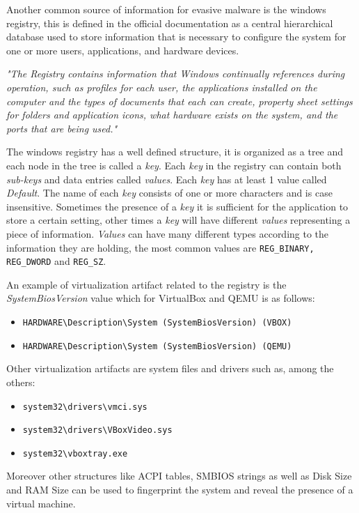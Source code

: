 Another common source of information for evasive malware is the windows registry, this is defined in the official documentation as a central hierarchical database used to store information that is necessary to configure the system for one or more users, applications, and hardware devices.

\textit{"The Registry contains information that Windows continually references during operation, such as profiles for each user, the applications installed on the computer and the types of documents that each can create, property sheet settings for folders and application icons, what hardware exists on the system, and the ports that are being used."}\cite{windocs}

The windows registry has a well defined structure, it is organized as a tree and each node in the tree is called a \textit{key}. Each \textit{key} in the registry can contain both \textit{sub-keys} and data entries called \textit{values}. Each \textit{key} has at least 1 value called \textit{Default}. The name of each \textit{key} consists of one or more characters and is case insensitive. Sometimes the presence of a \textit{key} it is sufficient for the application to store a certain setting, other times a \textit{key} will have different \textit{values} representing a piece of information. \textit{Values} can have many different types according to the information they are holding, the most common values are \lstinline{REG_BINARY, REG_DWORD} and \lstinline{REG_SZ}. 


An example of virtualization artifact related to the registry is the \textit{SystemBiosVersion} value which for VirtualBox and QEMU is as follows:
\begin{itemize}
    \item \lstinline{HARDWARE\Description\System (SystemBiosVersion) (VBOX)}
    \item \lstinline{HARDWARE\Description\System (SystemBiosVersion) (QEMU)} 
\end{itemize}

Other virtualization artifacts are system files and drivers such as, among the others:
\begin{itemize}
    \item \lstinline{system32\drivers\vmci.sys}
    \item \lstinline{system32\drivers\VBoxVideo.sys}
    \item \lstinline{system32\vboxtray.exe}
\end{itemize}

Moreover other structures like ACPI tables, SMBIOS strings as well as Disk Size and RAM Size can be used to fingerprint the system and reveal the presence of a virtual machine. 


